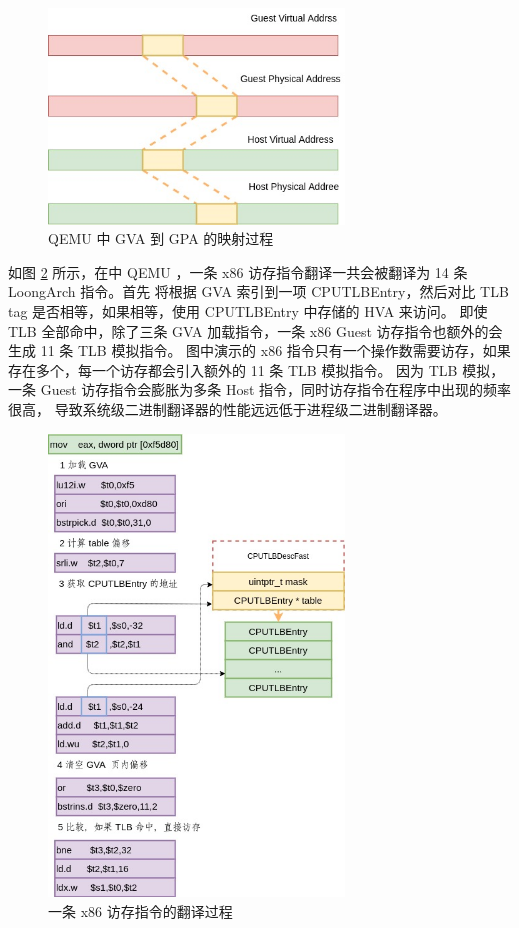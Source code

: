 \begin{figure}[!htbp]
	\centering
	\includegraphics[width=0.7\textwidth]{./images/sys-as.jpg}
	\caption{QEMU 中 GVA 到 GPA 的映射过程}
	\label{fig:sys-as}
\end{figure}

如图 \ref{fig:softmmu} 所示，在中 QEMU ，一条 x86 访存指令翻译一共会被翻译为 14 条 LoongArch 指令。首先
将根据 GVA 索引到一项 CPUTLBEntry，然后对比 TLB tag 是否相等，如果相等，使用 CPUTLBEntry 中存储的 HVA 来访问。
即使 TLB 全部命中，除了三条 GVA 加载指令，一条 x86 Guest 访存指令也额外的会生成 11 条 TLB 模拟指令。
图中演示的 x86 指令只有一个操作数需要访存，如果存在多个，每一个访存都会引入额外的 11 条 TLB 模拟指令。
因为 TLB 模拟，一条 Guest 访存指令会膨胀为多条 Host 指令，同时访存指令在程序中出现的频率很高，
导致系统级二进制翻译器的性能远远低于进程级二进制翻译器。

\begin{figure}[!htbp]
	\centering
	\includegraphics[width=0.7\textwidth]{./images/softmmu.jpg}
	\caption{一条 x86 访存指令的翻译过程}
	\label{fig:softmmu}
\end{figure}

